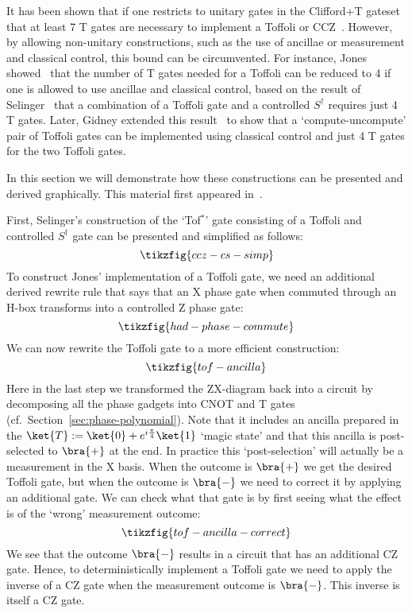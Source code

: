\documentclass[a4paper,onecolumn,superscriptaddress,11pt,%
				unpublished,%
				allowfontchageintitle,%
				]{quantumarticle}
\begin{document}
It has been shown that if one restricts to unitary gates in the Clifford+T gateset that at least 7 T gates are necessary to implement a Toffoli or CCZ~\cite{meet-in-the-middle2013,di2016parallelizing}. However, by allowing non-unitary constructions, such as the use of ancillae or measurement and classical control, this bound can be circumvented.
For instance, Jones showed~\cite{jones2013low} that the number of T gates needed for a Toffoli can be reduced to 4 if one is allowed to use ancillae and classical control, based on the result of Selinger~\cite{selinger2013quantum} that a combination of a Toffoli gate and a controlled $S^\dagger$ requires just 4 T gates.
Later, Gidney extended this result~\cite{Gidney2018halvingcostof} to show that a `compute-uncompute' pair of Toffoli gates can be implemented using classical control and just 4 T gates for the two Toffoli gates.

In this section we will demonstrate how these constructions can be presented and derived graphically. This material first appeared in~\cite{GraphicalFourier2019}.

First, Selinger's construction of the `Tof$^*$' gate consisting of a Toffoli and controlled $S^\dagger$ gate can be presented and simplified as follows:
\begin{equation}\label{eq:ccz-cs-simp}
	\tikzfig{ccz-cs-simp}
\end{equation}
To construct Jones' implementation of a Toffoli gate, we need an additional derived rewrite rule that says that an X phase gate when commuted through an H-box transforms into a controlled Z phase gate:
\begin{equation}\label{eq:had-phase-commute}
	\tikzfig{had-phase-commute}
\end{equation}
We can now rewrite the Toffoli gate to a more efficient construction:
\begin{equation}\label{eq:tof-ancilla}
	\tikzfig{tof-ancilla}
\end{equation}
Here in the last step we transformed the ZX-diagram back into a circuit by decomposing all the phase gadgets into CNOT and T gates (cf.~Section~\ref{sec:phase-polynomial}). Note that it includes an ancilla prepared in the $\ket{T}:=\ket{0} + e^{i\frac\pi4}\ket{1}$ `magic state' and that this ancilla is post-selected to $\bra{+}$ at the end. In practice this `post-selection' will actually be a measurement in the X basis. When the outcome is $\bra{+}$ we get the desired Toffoli gate, but when the outcome is $\bra{-}$ we need to correct it by applying an additional gate. We can check what that gate is by first seeing what the effect is of the `wrong' measurement outcome:
\begin{equation}\label{eq:tof-ancilla-correct}
	\tikzfig{tof-ancilla-correct}
\end{equation}
We see that the outcome $\bra{-}$ results in a circuit that has an additional CZ gate. Hence, to deterministically implement a Toffoli gate we need to apply the inverse of a CZ gate when the measurement outcome is $\bra{-}$. This inverse is itself a CZ gate.
\end{document}
